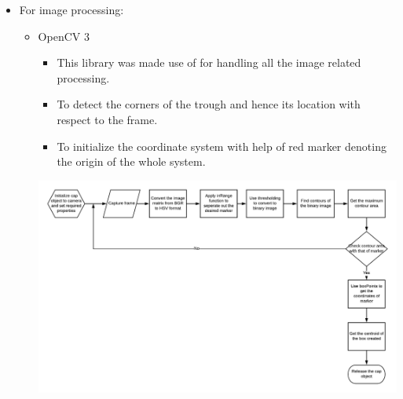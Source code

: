 \documentclass[a4paper,12pt,oneside]{book}
\begin{document}
\begin{itemize}
    \item For image processing:
        \begin{itemize}
            \item OpenCV 3 
                \begin{itemize}
                    \item This library was made use of for handling all the image related processing.
                    \item To detect the corners of the trough and hence its location with respect to the frame.
                    \item To initialize the coordinate system with help of red marker denoting the origin of the whole system.
                \end{itemize}
                \begin{center}
                    \includegraphics[scale=.5]{image_processing_1.png}
                \end{center}
        \end{itemize}
        

\end{itemize}
\end{document}
